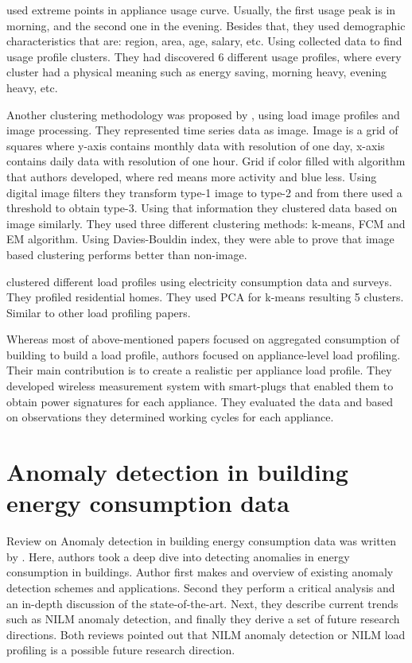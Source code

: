 \documentclass[
11pt, %
english, %
singlespacing, %
headsepline, %
]{MastersDoctoralThesis} %
\begin{document}
\cite{Jeong2021} used extreme points in appliance usage curve.
Usually, the first usage peak is in morning, and the second one in the evening. 
Besides that, they used demographic characteristics that are: region, area, age, salary, etc. 
Using collected data to find usage profile clusters. They had discovered  6 different usage profiles, 
where every cluster had a physical meaning such as energy saving, morning heavy, evening heavy, etc.

Another clustering methodology was proposed by \cite{Park2019}, using load image profiles and image processing.
They represented time series data as image. Image is a grid of squares where y-axis contains monthly data with resolution of one day,
x-axis contains daily data with resolution of one hour. Grid if color filled with algorithm that authors developed,
where red means more activity and blue less. Using digital image filters they transform type-1 image to type-2 and from there
used a threshold to obtain type-3. Using that information they clustered data based on image similarly. They used three different 
clustering methods: k-means, FCM and EM algorithm. Using Davies-Bouldin index, they were able to prove that image based clustering performs better than non-image.

\cite{Joana2012} clustered different load profiles using electricity consumption data and surveys. They profiled residential homes. 
They used PCA for k-means resulting 5 clusters. Similar to other load profiling papers. 

Whereas most of above-mentioned papers focused on aggregated consumption of building to build a load profile,
authors \cite{Issi2018} focused on appliance-level load profiling.
Their main contribution is to create a realistic per appliance load profile.
They developed wireless measurement system with smart-plugs that enabled them to obtain 
power signatures for each appliance. They evaluated the data and based on observations they determined working cycles for each appliance.

\section{Anomaly detection in building energy consumption data}

Review on Anomaly detection in building energy consumption data was written by \cite{HIMEUR2021116601}.
Here, authors took a deep dive into detecting anomalies in energy consumption in buildings. 
Author first makes and overview of existing anomaly detection schemes and applications.
Second they perform a critical analysis and an in-depth discussion of the state-of-the-art.
Next, they describe current trends such as NILM anomaly detection, and finally they derive a set of future research directions. 
Both reviews pointed out that NILM anomaly detection or NILM load profiling is a possible future research direction.
\end{document}
